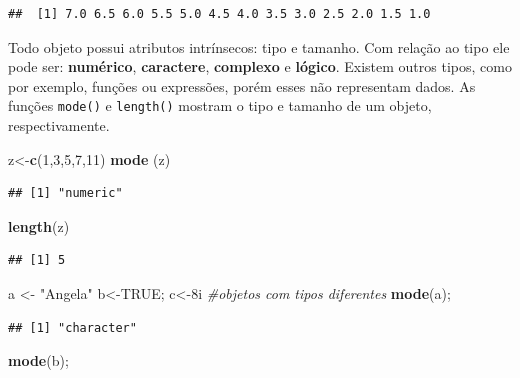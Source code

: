 \documentclass[]{book}
\newenvironment{Shaded}{\begin{snugshade}}{\end{snugshade}}
\newcommand{\CommentTok}[1]{\textcolor[rgb]{0.56,0.35,0.01}{\textit{#1}}}
\newcommand{\DecValTok}[1]{\textcolor[rgb]{0.00,0.00,0.81}{#1}}
\newcommand{\KeywordTok}[1]{\textcolor[rgb]{0.13,0.29,0.53}{\textbf{#1}}}
\newcommand{\NormalTok}[1]{#1}
\newcommand{\OtherTok}[1]{\textcolor[rgb]{0.56,0.35,0.01}{#1}}
\newcommand{\StringTok}[1]{\textcolor[rgb]{0.31,0.60,0.02}{#1}}
\begin{document}
\begin{verbatim}
##  [1] 7.0 6.5 6.0 5.5 5.0 4.5 4.0 3.5 3.0 2.5 2.0 1.5 1.0
\end{verbatim}

Todo objeto possui atributos intrínsecos: tipo e tamanho. Com relação ao tipo ele pode ser: \textbf{numérico}, \textbf{caractere}, \textbf{complexo} e \textbf{lógico}. Existem outros tipos, como por exemplo, funções ou expressões, porém esses não representam dados.
As funções \texttt{mode()} e \texttt{length()} mostram o tipo e tamanho de um objeto, respectivamente.

\begin{Shaded}
\begin{Highlighting}[]
\NormalTok{z<-}\KeywordTok{c}\NormalTok{(}\DecValTok{1}\NormalTok{,}\DecValTok{3}\NormalTok{,}\DecValTok{5}\NormalTok{,}\DecValTok{7}\NormalTok{,}\DecValTok{11}\NormalTok{) }
\KeywordTok{mode}\NormalTok{ (z)}
\end{Highlighting}
\end{Shaded}

\begin{verbatim}
## [1] "numeric"
\end{verbatim}

\begin{Shaded}
\begin{Highlighting}[]
\KeywordTok{length}\NormalTok{(z)}
\end{Highlighting}
\end{Shaded}

\begin{verbatim}
## [1] 5
\end{verbatim}

\begin{Shaded}
\begin{Highlighting}[]
\NormalTok{a <-}\StringTok{ "Angela"}
\NormalTok{b<-}\OtherTok{TRUE}\NormalTok{; }
\NormalTok{c<-8i }\CommentTok{#objetos com tipos diferentes}
\KeywordTok{mode}\NormalTok{(a); }
\end{Highlighting}
\end{Shaded}

\begin{verbatim}
## [1] "character"
\end{verbatim}

\begin{Shaded}
\begin{Highlighting}[]
\KeywordTok{mode}\NormalTok{(b); }
\end{Highlighting}
\end{Shaded}
\end{document}
